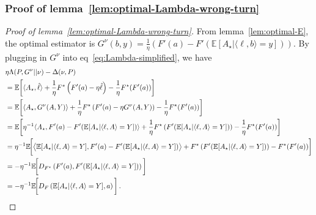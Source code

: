 \documentclass{article}
\theoremstyle{plain}
\theoremstyle{definition}
\newcommand{\E}{\mathbb E}
\newcommand{\hl}{\hat{\ell}\xspace}
\begin{document}
\subsubsection{Proof of lemma~\ref{lem:optimal-Lambda-wrong-turn}}
\label{proof:lem:optimal-Lambda-wrong-turn}
\begin{proof}[Proof of lemma~\ref{lem:optimal-Lambda-wrong-turn}]
    From lemma~\ref{lem:optimal-E}, the optimal estimator is
    $
        G^\nu(b, y)  =
        \frac{1}{\eta}\left(
        F'(a) - F'(\E[A_\star|\langle \ell, b\rangle = y])
        \right)$.
    By plugging in $G^\nu$ into eq~\ref{eq:Lambda-simplified}, we have
    \begin{align*}
         & \eta \Lambda(P, G^\nu|| \nu)  - \Delta(\nu, P)
        \\
         & =
        \E\!\left[
            \langle A_\star, \hl \rangle
            + \frac{1}{\eta} F^\star\left(F'(a) - \eta \hl\right)
            - \frac{1}{\eta} F^\star(F'(a))
            \right]
        \\
         & =
        \E\!\left[
            \langle A_\star, G^\nu(A, Y) \rangle
            + \frac{1}{\eta} F^\star\left(F'(a) - \eta G^\nu(A, Y)\right)
            - \frac{1}{\eta} F^\star(F'(a))
            \right]
        \\
         & =
        \E\!\left[
            \eta^{-1}\langle A_\star,
            F'(a) - F'(\E[A_\star|\langle \ell, A\rangle = Y])
            \rangle
            + \frac{1}{\eta} F^\star\left(
            F'(\E[A_\star|\langle \ell, A\rangle = Y])
            \right)
            - \frac{1}{\eta} F^\star(F'(a))
            \right]
        \\
         & =\eta^{-1}
        \E\!\bigg[
            \big\langle
            \E[A_\star|\langle \ell, A\rangle = Y],
            F'(a) - F'(\E[A_\star|\langle \ell, A\rangle = Y])
            \big\rangle
            + F^\star\left(
            F'(\E[A_\star|\langle \ell, A\rangle = Y])
            \right)
            - F^\star(F'(a))
            \bigg]
        \\
         & =
        -\eta^{-1}
        \E\!\bigg[
            D_{F^\star}\left(F'(a), F'(\E[A_\star|\langle \ell, A\rangle = Y])\right)
            \bigg]
        \\
         & =
        -\eta^{-1}
        \E\!\bigg[
            D_F\left(
            \E[A_\star|\langle \ell, A\rangle = Y], a
            \right)
            \bigg]\,. \qedhere
    \end{align*}
\end{proof}
\end{document}
